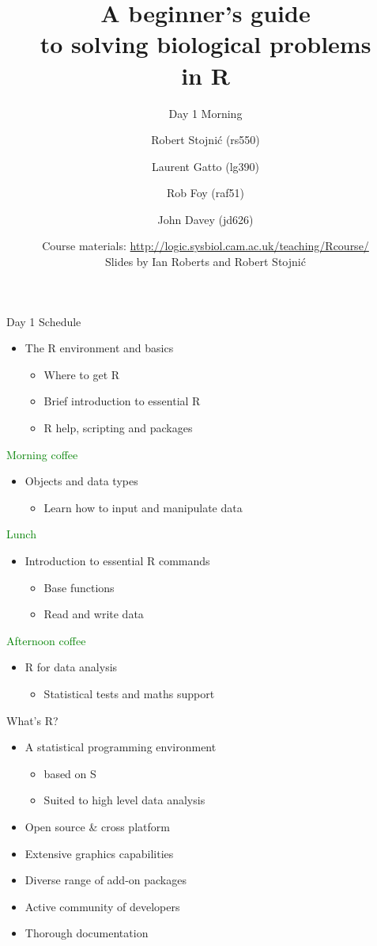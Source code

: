 \documentclass{beamer}
\title[Cambridge R Course]{A beginner's guide\\to solving biological problems\\in R}
\subtitle{Day 1 Morning\\}
\author[]{Robert Stojni\'{c} (rs550) \and Laurent Gatto (lg390) \and Rob Foy (raf51) \and John Davey (jd626)}
\date[]{Course materials: \url{http://logic.sysbiol.cam.ac.uk/teaching/Rcourse/}\\Slides by Ian Roberts and Robert Stojni\'{c}}
\begin{document}
\begin{frame}
    \titlepage
\end{frame}


\begin{frame}{Day 1 Schedule}

\begin{itemize}
  \item The R environment and basics
  \begin{itemize}
      \item Where to get R
      \item Brief introduction to essential R
      \item R help, scripting and packages
  \end{itemize}
\end{itemize}
\textcolor{green}{Morning coffee}
\begin{itemize}
  \item Objects and data types
  \begin{itemize}
      \item Learn how to input and manipulate data
  \end{itemize}
\end{itemize}
\textcolor{green}{Lunch}
\begin{itemize}
    \item Introduction to essential R commands
    \begin{itemize}
        \item Base functions
        \item Read and write data
    \end{itemize}
\end{itemize}
\textcolor{green}{Afternoon coffee}
\begin{itemize}
    \item R for data analysis
    \begin{itemize}
        \item Statistical tests and maths support
    \end{itemize}
\end{itemize}

\end{frame}

\begin{frame}{What's R?}
    \begin{itemize}
        \item A statistical programming environment
        \begin{itemize}
            \item based on S
            \item Suited to high level data analysis
        \end{itemize}
        \item Open source \& cross platform
        \item Extensive graphics capabilities
        \item Diverse range of add-on packages
        \item Active community of developers
        \item Thorough documentation
    \end{itemize}
\end{frame}
\end{document}
